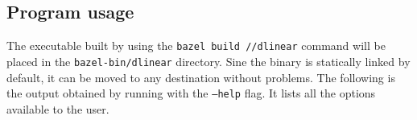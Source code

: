 \begin{appendices}
    \chapter{Program usage}

    The \dlinear executable built by \bazel using the \texttt{bazel build //dlinear} command will be placed in the \texttt{bazel-bin/dlinear} directory.
    Sine the binary is statically linked by default, it can be moved to any destination without problems.
    The following is the output obtained by running \dlinear with the \texttt{--help} flag.
    It lists all the options available to the user.

    

\end{appendices}
